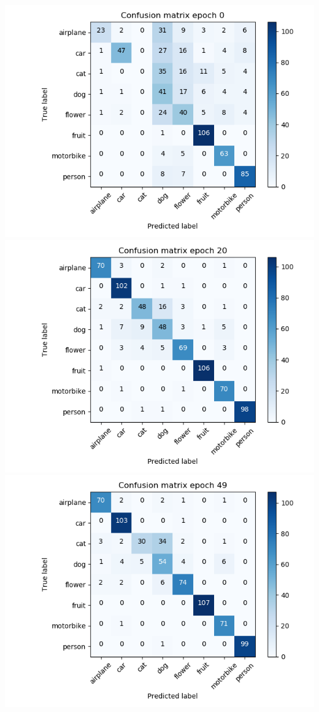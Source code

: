 \documentclass{article}
\begin{document}
\begin{minipage}[c]{\textwidth}
	\includegraphics[width= \figureWidth\textwidth]{./figures/cm_h64_w64_r_none_e0.png}
	\includegraphics[width= \figureWidth\textwidth]{./figures/cm_h64_w64_r_none_e20.png}
	\includegraphics[width= \figureWidth\textwidth]{./figures/cm_h64_w64_r_none_e49.png}
	


\end{minipage}
\end{document}
